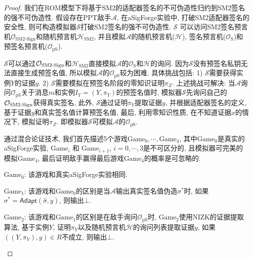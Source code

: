 \documentclass[review]{jcr}
\begin{document}
\begin{proof}
我们在ROM模型下将基于SM2的适配器签名的不可伪造性归约到SM2签名的强不可伪造性. 假设存在PPT敌手$\mathcal{A}$, 在aSigForge实验中, 打破SM2适配器签名的安全性, 则可构造模拟器$\mathcal{S}$打破SM2签名的强不可伪造性. 
$\mathcal{S}$ 可以访问SM2签名预言机$\mathcal{O}_{\text{SM2-Sign}}$和随机预言机$\mathcal{H}_{\text{SM2}}$, 并且模拟$\mathcal{A}$的随机预言机($\mathcal{H}$), 签名预言机($\mathcal{O}_{\text{S}}$)和预签名预言机($\mathcal{O}_{\text{pS}}$). 

$\mathcal{S}$可以通过$\mathcal{O}_{\text{SM2\text{-}Sign}}$和$\mathcal{H}_{\text{SM2}}$直接模拟$\mathcal{A}$的$\mathcal{O}_{\text{S}}$和$\mathcal{H}$的询问. 因为$\mathcal{S}$没有预签名私钥无法直接生成预签名值, 所以模拟$\mathcal{A}$的$\mathcal{O}_{\text{pS}}$较为困难. 具体挑战包括: 1) $\mathcal{S}$需要获得实例$Y$的证据$y$. 2) $\mathcal{S}$需要模拟在预签名阶段的零知识证明$\pi_Z$. 上述挑战可解决: 当$\mathcal{A}$询问$\mathcal{O}_{\text{pS}}$关于消息$m$和实例$I_Y = (Y, \pi_Y)$的预签名值时, 模拟器$\mathcal{S}$先询问自己的$\mathcal{O}_{\text{SM2\text{-}Sign}}$获得真实签名, 此外, $\mathcal{S}$通过证明$\pi_Y$提取证据$y$, 并根据适配器签名的定义, 基于证据$y$和真实签名值计算预签名值, 最后, 利用零知识性质, 在不知道证据$x$的情况下, 模拟证明$\pi_Z$. 即模拟器$\mathcal{S}$可模拟$\mathcal{A}$的$\mathcal{O}_{\text{pS}}$. 

通过混合论证技术, 我们首先描述5个游戏$\text{Game}_0,\cdots,\text{Game}_4$, 其中$\text{Game}_0$是真实的aSigForge实验, $\text{Game}_i$ 和 $\text{Game}_{i+1}$, $i = 0,\cdots,3$是不可区分的, 且模拟器可完美的模拟$\text{Game}_4$, 最后证明敌手赢得最后游戏$\text{Game}_4$的概率是可忽略的. 

\begin{trivlist}
\item $\text{Game}_0$: 该游戏和真实aSigForge实验相同. 
\end{trivlist}

\begin{trivlist}
\item $\text{Game}_1$: 该游戏和$\text{Game}_0$的区别是当$\mathcal{A}$输出真实签名值伪造$\sigma^*$时, 如果$\sigma^*=\mathsf{Adapt}(\hat{\sigma},y)$, 则输出$\bot$. 
\end{trivlist}

\begin{trivlist}
\item $\text{Game}_2$: 该游戏和$\text{Game}_1$的区别是在敌手询问$\mathcal{O}_{\text{pS}}$时, $\text{Game}_2$使用NIZK的证据提取算法, 基于实例$Y$, 证明$\pi_Y$以及随机预言机$\mathcal{H}$的询问列表提取证据$y$, 如果$((Y, \pi_Y), y) \in R$不成立, 则输出$\bot$. 
\end{trivlist}


\end{proof}
\end{document}
